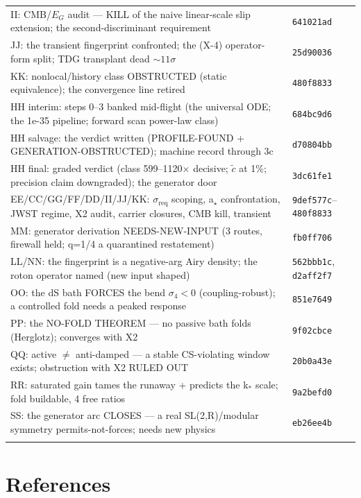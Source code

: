 \documentclass[11pt,a4paper]{article}
\begin{document}
\begin{longtable}{@{}p{11.5cm} l@{}}
II: CMB/$E_G$ audit --- KILL of the naive linear-scale slip extension; the second-discriminant requirement & \texttt{641021ad} \\
JJ: the transient fingerprint confronted; the (X-4) operator-form split; TDG transplant dead ${\sim}11\sigma$ & \texttt{25d90036} \\
KK: nonlocal/history class OBSTRUCTED (static equivalence); the convergence line retired & \texttt{480f8833} \\
HH interim: steps 0--3 banked mid-flight (the universal ODE; the 1e-35 pipeline; forward scan power-law class) & \texttt{684bc9d6} \\
HH salvage: the verdict written (PROFILE-FOUND + GENERATION-OBSTRUCTED); machine record through 3c & \texttt{d70804bb} \\
HH final: graded verdict (class 599--1120$\times$ decisive; $\tilde c$ at 1\%; precision claim downgraded); the generator door & \texttt{3dc61fe1} \\
EE/CC/GG/FF/DD/II/JJ/KK: $\sigma_{\mathrm{req}}$ scoping, a$_\star$ confrontation, JWST regime, X2 audit, carrier closures, CMB kill, transient & \texttt{9def577c}--\texttt{480f8833} \\
MM: generator derivation NEEDS-NEW-INPUT (3 routes, firewall held; q=1/4 a quarantined restatement) & \texttt{fb0ff706} \\
LL/NN: the fingerprint is a negative-arg Airy density; the roton operator named (new input shaped) & \texttt{562bbb1c}, \texttt{d2aff2f7} \\
OO: the dS bath FORCES the bend $\sigma_4<0$ (coupling-robust); a controlled fold needs a peaked response & \texttt{851e7649} \\
PP: the NO-FOLD THEOREM --- no passive bath folds (Herglotz); converges with X2 & \texttt{9f02cbce} \\
QQ: active $\ne$ anti-damped --- a stable CS-violating window exists; obstruction with X2 RULED OUT & \texttt{20b0a43e} \\
RR: saturated gain tames the runaway + predicts the k$_*$ scale; fold buildable, 4 free ratios & \texttt{9a2befd0} \\
SS: the generator arc CLOSES --- a real SL(2,R)/modular symmetry permits-not-forces; needs new physics & \texttt{eb26ee4b} \\
\addlinespace
\end{longtable}

\section*{References}
\end{document}
